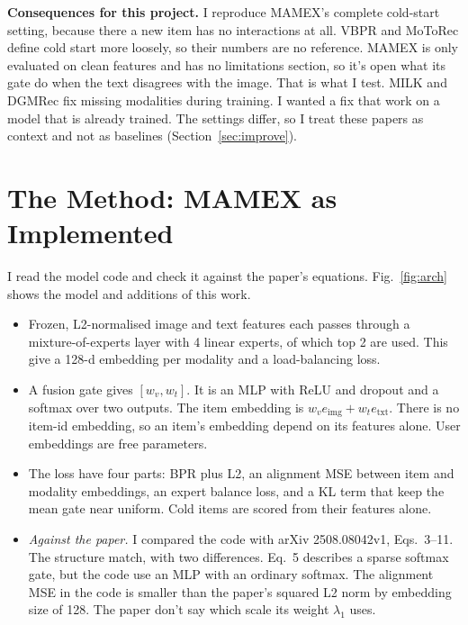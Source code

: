 \documentclass[conference]{IEEEtran}
\begin{document}
\textbf{Consequences for this project.} I reproduce MAMEX's complete cold-start setting, because there a new item has no interactions at all. VBPR and MoToRec define cold start more loosely, so their numbers are no reference. MAMEX is only evaluated on clean features and has no limitations section, so it's open what its gate do when the text disagrees with the image. That is what I test. MILK and DGMRec fix missing modalities during training. I wanted a fix that work on a model that is already trained. The settings differ, so I treat these papers as context and not as baselines (Section~\ref{sec:improve}).

\section{The Method: MAMEX as Implemented}

I read the model code and check it against the paper's equations. Fig.~\ref{fig:arch} shows the model and additions of this work.
\begin{itemize}
\item Frozen, L2-normalised image and text features each passes through a mixture-of-experts layer with 4 linear experts, of which top 2 are used. This give a 128-d embedding per modality and a load-balancing loss.
\item A fusion gate gives $[w_v, w_t]$. It is an MLP with ReLU and dropout and a softmax over two outputs. The item embedding is $w_v e_{\text{img}} + w_t e_{\text{txt}}$. There is no item-id embedding, so an item's embedding depend on its features alone. User embeddings are free parameters.
\item The loss have four parts: BPR plus L2, an alignment MSE between item and modality embeddings, an expert balance loss, and a KL term that keep the mean gate near uniform. Cold items are scored from their features alone.
\item \emph{Against the paper.} I compared the code with arXiv 2508.08042v1, Eqs.~3--11. The structure match, with two differences. Eq.~5 describes a sparse softmax gate, but the code use an MLP with an ordinary softmax. The alignment MSE in the code is smaller than the paper's squared L2 norm by embedding size of 128. The paper don't say which scale its weight $\lambda_1$ uses.
\end{itemize}
\end{document}
